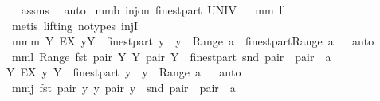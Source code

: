 \begin{isabellebody}
\isadelimproof
\ %
\endisadelimproof
%
\isatagproof
{}\isamarkupfalse%
\ assms\ \isamarkupfalse%
\ auto%
\endisatagproof
{\isafoldproof}%
%
\isadelimproof
%
\endisadelimproof
\isanewline
{}\isamarkupfalse%
\ mm{}{}b{\isacharcolon}\ {\isachardoublequoteopen}inj{\isacharunderscore}on\ finestpart\ UNIV{\isachardoublequoteclose}%
\isadelimproof
\ %
\endisadelimproof
%
\isatagproof
{}\isamarkupfalse%
\ mm{}{}\ ll{}{}\ \isamarkupfalse%
\ {\isacharparenleft}metis\ {\isacharparenleft}lifting{\isacharcomma}\ no{\isacharunderscore}types{\isacharparenright}\ injI{\isacharparenright}%
\endisatagproof
{\isafoldproof}%
%
\isadelimproof
%
\endisadelimproof
\isanewline
\isanewline
{}\isamarkupfalse%
\ mm{}{}m{\isacharcolon}\ {\isachardoublequoteopen}{\isacharbraceleft}Y{\isachardot}\ EX\ y{\isachardot}{\isacharparenleft}{\isacharparenleft}Y\ {\isasymin}\ finestpart\ y{\isacharparenright}\ {\isacharampersand}\ {\isacharparenleft}y\ {\isasymin}\ Range\ a{\isacharparenright}{\isacharparenright}{\isacharbraceright}\ {\isacharequal}\ {\isasymUnion}{\isacharparenleft}finestpart{\isacharbackquote}{\isacharparenleft}Range\ a{\isacharparenright}{\isacharparenright}{\isachardoublequoteclose}%
\isadelimproof
\ %
\endisadelimproof
%
\isatagproof
{}\isamarkupfalse%
\ auto%
\endisatagproof
{\isafoldproof}%
%
\isadelimproof
%
\endisadelimproof
\isanewline
\isanewline
{}\isamarkupfalse%
\ mm{}{}l{\isacharcolon}\ {\isachardoublequoteopen}Range\ {\isacharbraceleft}{\isacharparenleft}fst\ pair{\isacharcomma}\ Y{\isacharparenright}{\isacharbar}\ Y\ pair{\isachardot}\ Y\ {\isasymin}\ finestpart\ {\isacharparenleft}snd\ pair{\isacharparenright}\ {\isacharampersand}\ pair\ {\isasymin}\ a{\isacharbraceright}\ {\isacharequal}\ \isanewline
{\isacharbraceleft}Y{\isachardot}\ EX\ y{\isachardot}\ {\isacharparenleft}{\isacharparenleft}Y\ {\isasymin}\ finestpart\ y{\isacharparenright}\ {\isacharampersand}\ {\isacharparenleft}y\ {\isasymin}\ Range\ a{\isacharparenright}{\isacharparenright}{\isacharbraceright}{\isachardoublequoteclose}%
\isadelimproof
\ %
\endisadelimproof
%
\isatagproof
{}\isamarkupfalse%
\ auto%
\endisatagproof
{\isafoldproof}%
%
\isadelimproof
%
\endisadelimproof
\isanewline
\isanewline
{}\isamarkupfalse%
\ mm{}{}j{\isacharcolon}\ {\isachardoublequoteopen}{\isacharbraceleft}{\isacharparenleft}fst\ pair{\isacharcomma}\ {\isacharbraceleft}y{\isacharbraceright}{\isacharparenright}{\isacharbar}\ y\ pair{\isachardot}\ y\ {\isasymin}\ snd\ pair\ {\isacharampersand}\ pair\ {\isasymin}\ a{\isacharbraceright}\ {\isacharequal}\ \isanewline

\end{isabellebody}
